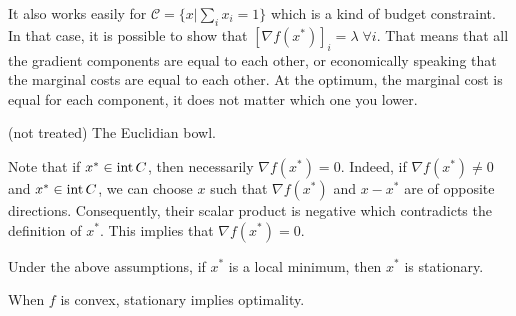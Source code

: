 \begin{example}
\begin{leftbar}
It also works easily for $\mathcal{C} = \{x|\sum_{i}x_i=1\}$ which is a kind of budget constraint. In that case, it is possible to show that $[\nabla f(x^*)]_i = \lambda \; \forall i$. That means that all the gradient components are equal to each other, or economically speaking that the marginal costs are equal to each other. At the optimum, the marginal cost is equal for each component, it does not matter which one you lower.
\end{leftbar}
\end{example}

\begin{example}
\begin{leftbar}
(not treated) The Euclidian bowl.
\end{leftbar}
\end{example}


Note that if $x^* \in \mathrm{int}\, C$, then necessarily $\nabla f(x^*) = 0$.
Indeed, if $\nabla f(x^*) \neq 0$ and $x^* \in \mathrm{int}\, C$, we can choose $x$ such that $\nabla f(x^*)$ and $x-x^*$ are of opposite directions. Consequently, their scalar product is negative which contradicts the definition of $x^*$. This implies that $\nabla f(x^*) = 0$.

\begin{theorem}
Under the above assumptions, if $x^*$ is a local minimum, then $x^*$ is stationary.
\end{theorem}

\begin{theorem}
When $f$ is convex, stationary implies optimality.
\end{theorem}


